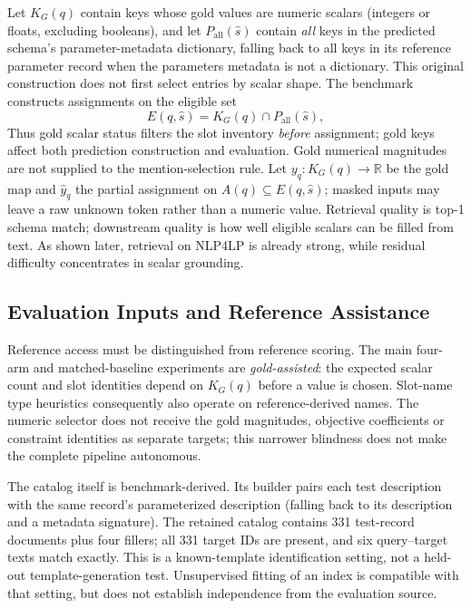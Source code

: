\documentclass[pdflatex,iicol,sn-basic,Numbered]{sn-jnl}
\begin{document}
Let $K_G(q)$ contain keys whose gold values are numeric scalars (integers or floats, excluding booleans), and let $P_{\mathrm{all}}(\hat{s})$ contain \emph{all} keys in the predicted schema's parameter-metadata dictionary, falling back to all keys in its reference parameter record when the parameters metadata is not a dictionary. This original construction does not first select entries by scalar shape. The benchmark constructs assignments on the eligible set
\begin{equation}
E(q,\hat{s}) = K_G(q) \cap P_{\mathrm{all}}(\hat{s}),
\label{eq:eligible_slots}
\end{equation}
Thus gold scalar status filters the slot inventory \emph{before} assignment; gold keys affect both prediction construction and evaluation. Gold numerical magnitudes are not supplied to the mention-selection rule. Let $y_q : K_G(q) \to \mathbb{R}$ be the gold map and $\hat{y}_{q}$ the partial assignment on $A(q) \subseteq E(q,\hat{s})$; masked inputs may leave a raw unknown token rather than a numeric value. Retrieval quality is top-1 schema match; downstream quality is how well eligible scalars can be filled from text. As shown later, retrieval on \textsc{NLP4LP} is already strong, while residual difficulty concentrates in scalar grounding.

\subsection{Evaluation Inputs and Reference Assistance}
\label{subsec:assistance-setting}

Reference access must be distinguished from reference scoring. The main four-arm and matched-baseline experiments are \emph{gold-assisted}: the expected scalar count and slot identities depend on $K_G(q)$ before a value is chosen. Slot-name type heuristics consequently also operate on reference-derived names. The numeric selector does not receive the gold magnitudes, objective coefficients or constraint identities as separate targets; this narrower blindness does not make the complete pipeline autonomous.

The catalog itself is benchmark-derived. Its builder pairs each test description with the same record's parameterized description (falling back to its description and a metadata signature). The retained catalog contains 331 test-record documents plus four fillers; all 331 target IDs are present, and six query--target texts match exactly. This is a known-template identification setting, not a held-out template-generation test. Unsupervised fitting of an index is compatible with that setting, but does not establish independence from the evaluation source.
\end{document}
